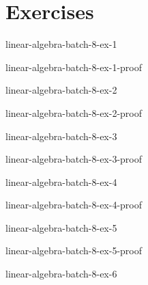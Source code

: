 \documentclass[preview]{standalone}
\begin{document}
\genpage

\section{Exercises}

\begin{snippetexercise}{linear-algebra-batch-8-ex-1}{}
    \todo
\end{snippetexercise}

\begin{snippetsolution}{linear-algebra-batch-8-ex-1-proof}{}
    \todo
\end{snippetsolution}

\begin{snippetexercise}{linear-algebra-batch-8-ex-2}{}
    \todo
\end{snippetexercise}

\begin{snippetsolution}{linear-algebra-batch-8-ex-2-proof}{}
    \todo
\end{snippetsolution}

\begin{snippetexercise}{linear-algebra-batch-8-ex-3}{}
    \todo
\end{snippetexercise}

\begin{snippetsolution}{linear-algebra-batch-8-ex-3-proof}{}
    \todo
\end{snippetsolution}

\begin{snippetexercise}{linear-algebra-batch-8-ex-4}{}
    \todo
\end{snippetexercise}

\begin{snippetsolution}{linear-algebra-batch-8-ex-4-proof}{}
    \todo
\end{snippetsolution}

\begin{snippetexercise}{linear-algebra-batch-8-ex-5}{}
    \todo
\end{snippetexercise}

\begin{snippetsolution}{linear-algebra-batch-8-ex-5-proof}{}
    \todo
\end{snippetsolution}

\begin{snippetexercise}{linear-algebra-batch-8-ex-6}{}
    \todo
\end{snippetexercise}
\end{document}
